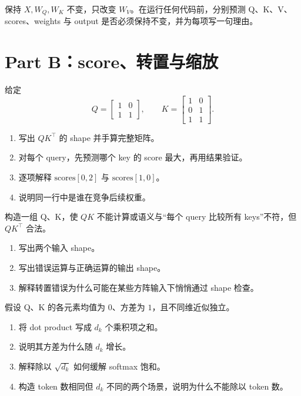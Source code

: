 \documentclass[11pt,a4paper]{article}
\begin{document}
保持 $X,W_Q,W_K$ 不变，只改变 $W_V$。在运行任何代码前，分别预测 Q、K、V、scores、weights 与 output 是否必须保持不变，并为每项写一句理由。
\AnswerSpace{34mm}

\section{Part B：score、转置与缩放}

给定
\[
Q=\begin{bmatrix}1&0\\1&1\end{bmatrix},\qquad
K=\begin{bmatrix}1&0\\0&1\\1&1\end{bmatrix}.
\]
\begin{enumerate}[label=(\arabic*)]
\item 写出 $QK^\top$ 的 shape 并手算完整矩阵。
\item 对每个 query，先预测哪个 key 的 score 最大，再用结果验证。
\item 逐项解释 $\text{scores}[0,2]$ 与 $\text{scores}[1,0]$。
\item 说明同一行中是谁在竞争后续权重。
\end{enumerate}
\AnswerSpace{38mm}

构造一组 Q、K，使 $QK$ 不能计算或语义与“每个 query 比较所有 keys”不符，但 $QK^\top$ 合法。
\begin{enumerate}[label=(\arabic*)]
\item 写出两个输入 shape。
\item 写出错误运算与正确运算的输出 shape。
\item 解释转置错误为什么可能在某些方阵输入下悄悄通过 shape 检查。
\end{enumerate}
\AnswerSpace{32mm}

假设 Q、K 的各元素均值为 $0$、方差为 $1$，且不同维近似独立。
\begin{enumerate}[label=(\arabic*)]
\item 将 dot product 写成 $d_k$ 个乘积项之和。
\item 说明其方差为什么随 $d_k$ 增长。
\item 解释除以 $\sqrt{d_k}$ 如何缓解 softmax 饱和。
\item 构造 token 数相同但 $d_k$ 不同的两个场景，说明为什么不能除以 token 数。
\end{enumerate}
\AnswerSpace{38mm}
\end{document}
